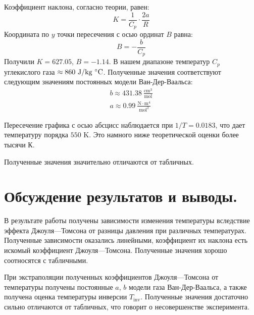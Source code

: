 \documentclass[a4paper,12pt]{report}
\begin{document}
\begin{multicols}{2}
        Коэффициент наклона, согласно теории, равен:
        \begin{equation*}
            K=\frac{1}{C_p}\cdot \frac{2a}{R}
        \end{equation*}
        Координата по $y$ точки пересечения с осью ординат $B$ равна:
        \begin{equation*}
            B=-\frac{b}{C_p}
        \end{equation*}
        Получили $K=627.05$, $B=-1.14$. В нашем диапазоне температур $C_p$ углекислого газа $\approx 860\ \text{J}/\text{kg}\ \celsius$. Полученные значения соответствуют следующим значениям постоянных модели Ван-Дер-Ваальса:
        \begin{gather*}
            b\approx 431.38 \  \frac{\text{cm}^3}{\text{mol}}\\
            a\approx 0.99 \ \frac{\text{N}\cdot \text{m}^4}{\text{mol}^2}
        \end{gather*}

        Пересечение графика с осью абсцисс наблюдается при $1/T=0.0183$, что дает температуру порядка $550$ K. Это намного ниже теоретической оценки более тысячи К.

        Полученные значения значительно отличаются от табличных.
        \section{Обсуждение результатов и выводы.}
        В результате работы получены зависимости изменения температуры вследствие эффекта Джоуля---Томсона от разницы давления при различных температурах. Полученные зависимости оказались линейными, коэффициент их наклона есть искомый коэффициент Джоуля---Томсона. Полученные значения хорошо соотносятся с табличными.

        При экстраполяции полученных коэффициентов Джоуля---Томсона от температуры получены постоянные $a$, $b$ модели газа Ван-Дер-Ваальса, а также получена оценка температуры инверсии $T_\text{inv}$. Полученные значения достаточно сильно отличаются от табличных, что говорит о несовершенстве эксперимента.
    \end{multicols}
\end{document}
